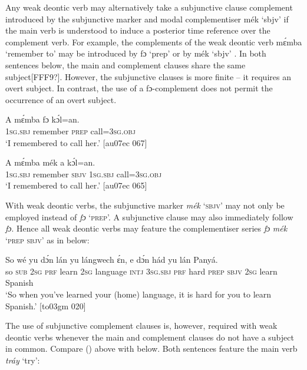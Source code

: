Any weak deontic verb may alternatively take a subjunctive clause complement introduced by the subjunctive marker and modal complementiser mék ‘sbjv’ if the main verb is understood to induce a posterior time reference over the complement verb. For example, the complements of the weak deontic verb mɛ́mba ‘remember to’ may be introduced by fɔ ‘prep’  or by mék ‘sbjv’ . In both sentences below, the main and complement clauses share the same subject[FFF9?]. However, the subjunctive clauses is more finite – it requires an overt subject. In contrast, the use of a fɔ-complement does not permit the occurrence of an overt subject.


\ea%
    \label{ex:key:1390}
    \gll A    mɛ́mba    fɔ  kɔ́l=an.\\
\textsc{1sg.sbj}  remember  \textsc{prep}  call=\textsc{3sg.obj}\\

\glt ‘I remembered to call her.’ [au07ec 067]
\z


\ea%
    \label{ex:key:1391}
    \gll A    mɛ́mba    mék    a    kɔ́l=an.\\
\textsc{1sg.sbj}  remember  \textsc{sbjv}    \textsc{1sg.sbj}  call=\textsc{3sg.obj}\\

\glt ‘I remembered to call her.’ [au07ec 065]
\z

With weak deontic verbs, the subjunctive marker \textit{mék} ‘\textsc{sbjv}’ may not only be employed instead of \textit{fɔ} ‘\textsc{prep}’. A subjunctive clause may also immediately follow \textit{fɔ}. Hence all weak deontic verbs may feature the complementiser series \textit{fɔ} \textit{mék} ‘\textsc{prep} \textsc{sbjv}’ as in  below:


\ea%
    \label{ex:key:1392}
    \gll So  wé  yu  dɔ́n    lán    yu  lángwech  ɛ́n,  e    dɔ́n  hád
     yu  lán    Panyá.\\
so  \textsc{sub}  \textsc{2sg}  \textsc{prf}    learn  \textsc{2sg}  language    \textsc{intj}  \textsc{3sg.sbj}  \textsc{prf}  hard
\textsc{prep}  \textsc{sbjv}    \textsc{2sg}  learn  Spanish\\

\glt ‘So when you’ve learned your (home) language, it is hard for you to learn 
Spanish.’ [to03gm 020]
\z

The use of subjunctive complement clauses is, however, required with weak deontic verbs whenever the main and complement clauses do not have a subject in common. Compare () above with  below. Both sentences feature the main verb \textit{tráy} ‘try’:


